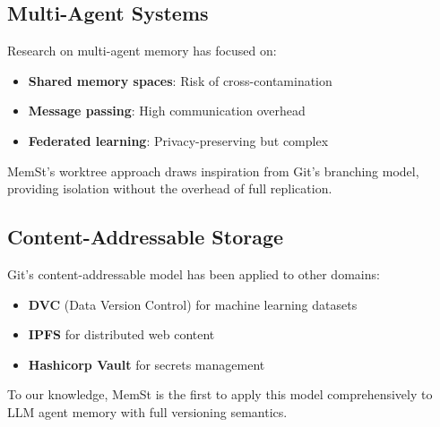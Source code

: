 \subsection{Multi-Agent Systems}

Research on multi-agent memory has focused on:
\begin{itemize}
    \item \textbf{Shared memory spaces}: Risk of cross-contamination \citep{wang2024multi}
    \item \textbf{Message passing}: High communication overhead
    \item \textbf{Federated learning}: Privacy-preserving but complex
\end{itemize}

MemSt's worktree approach draws inspiration from Git's branching model, providing isolation without the overhead of full replication.

\subsection{Content-Addressable Storage}

Git's content-addressable model has been applied to other domains:
\begin{itemize}
    \item \textbf{DVC} (Data Version Control) for machine learning datasets
    \item \textbf{IPFS} for distributed web content
    \item \textbf{Hashicorp Vault} for secrets management
\end{itemize}

To our knowledge, MemSt is the first to apply this model comprehensively to LLM agent memory with full versioning semantics.
